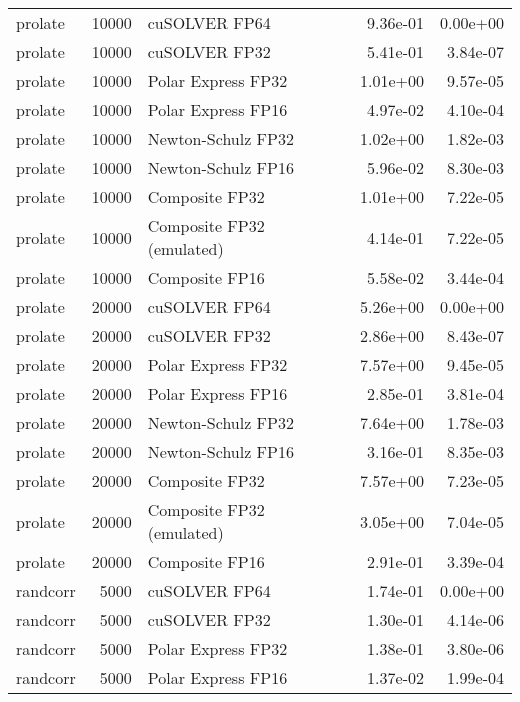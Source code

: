 \begin{table}
\begin{tabular}{lrlrr}
  prolate & 10000 &             cuSOLVER FP64 &  9.36e-01 &        0.00e+00 \\
  prolate & 10000 &             cuSOLVER FP32 &  5.41e-01 &        3.84e-07 \\
  prolate & 10000 &        Polar Express FP32 &  1.01e+00 &        9.57e-05 \\
  prolate & 10000 &        Polar Express FP16 &  4.97e-02 &        4.10e-04 \\
  prolate & 10000 &        Newton-Schulz FP32 &  1.02e+00 &        1.82e-03 \\
  prolate & 10000 &        Newton-Schulz FP16 &  5.96e-02 &        8.30e-03 \\
  prolate & 10000 &            Composite FP32 &  1.01e+00 &        7.22e-05 \\
  prolate & 10000 & Composite FP32 (emulated) &  4.14e-01 &        7.22e-05 \\
  prolate & 10000 &            Composite FP16 &  5.58e-02 &        3.44e-04 \\
  prolate & 20000 &             cuSOLVER FP64 &  5.26e+00 &        0.00e+00 \\
  prolate & 20000 &             cuSOLVER FP32 &  2.86e+00 &        8.43e-07 \\
  prolate & 20000 &        Polar Express FP32 &  7.57e+00 &        9.45e-05 \\
  prolate & 20000 &        Polar Express FP16 &  2.85e-01 &        3.81e-04 \\
  prolate & 20000 &        Newton-Schulz FP32 &  7.64e+00 &        1.78e-03 \\
  prolate & 20000 &        Newton-Schulz FP16 &  3.16e-01 &        8.35e-03 \\
  prolate & 20000 &            Composite FP32 &  7.57e+00 &        7.23e-05 \\
  prolate & 20000 & Composite FP32 (emulated) &  3.05e+00 &        7.04e-05 \\
  prolate & 20000 &            Composite FP16 &  2.91e-01 &        3.39e-04 \\
 randcorr &  5000 &             cuSOLVER FP64 &  1.74e-01 &        0.00e+00 \\
 randcorr &  5000 &             cuSOLVER FP32 &  1.30e-01 &        4.14e-06 \\
 randcorr &  5000 &        Polar Express FP32 &  1.38e-01 &        3.80e-06 \\
 randcorr &  5000 &        Polar Express FP16 &  1.37e-02 &        1.99e-04 \\

\end{tabular}
\end{table}
